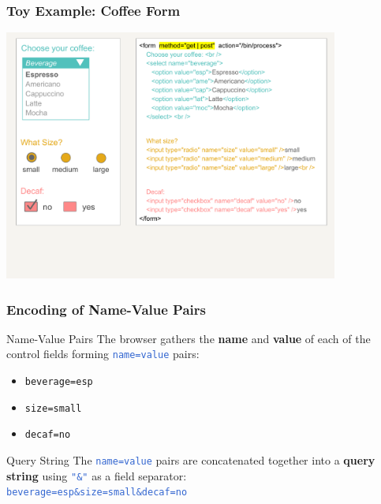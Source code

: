 \documentclass{beamer}\usepackage[]{graphicx}\usepackage[]{color}
\newcommand{\code}[1]{\texttt{#1}}
\newcommand{\highcode}[1]{\textcolor{highlight}{\texttt{#1}}}
\begin{document}

\begin{frame}[fragile]
\frametitle{Toy Example: Coffee Form}

\begin{center}
\includegraphics[width=11cm]{images/html_form_coffee.pdf}
\end{center}

\end{frame}


\begin{frame}[fragile]
\frametitle{Encoding of Name-Value Pairs}

\begin{block}{Name-Value Pairs}
The browser gathers the \textbf{name} and \textbf{value} of each of the control fields forming \highcode{name=value} pairs: 

\begin{itemize}
 \item \code{beverage=esp}
 \item \code{size=small}
 \item \code{decaf=no}
\end{itemize}
\end{block}

\begin{block}{Query String}
The \highcode{name=value} pairs are concatenated together into a \textbf{query string} using \highcode{"\&"} as a field separator: \\

\vspace{2mm}
\highcode{beverage=esp\&size=small\&decaf=no}
\end{block}

\end{frame}
\end{document}
